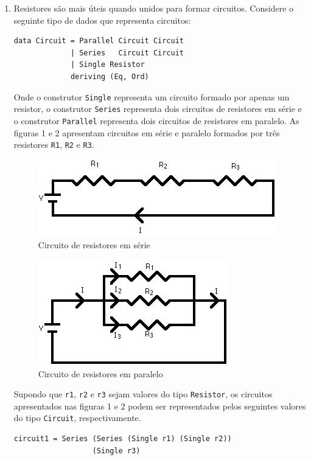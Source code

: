 \documentclass[11pt,a4paper]{article}
\begin{document}
\begin{enumerate}
\begin{enumerate}
    \end{enumerate}
    \item Resistores s\~ao mais \'uteis quando unidos para formar circuitos. Considere o seguinte tipo de dados que representa 
          circuitos:
\begin{verbatim}
data Circuit = Parallel Circuit Circuit
             | Series   Circuit Circuit
             | Single Resistor
             deriving (Eq, Ord)
\end{verbatim}	
Onde o construtor \texttt{Single} representa um circuito formado por apenas um resistor, o construtor \texttt{Series} representa dois circuitos de
resistores em s\'erie e o construtor \texttt{Parallel} representa dois circuitos de resistores em paralelo. As figuras 1 e 2 apresentam circuitos
em s\'erie e paralelo formados por tr\^es resistores \texttt{R1}, \texttt{R2} e \texttt{R3}.
\begin{figure}[htp]			
    \centering
    \includegraphics[scale=0.4]{Rseries.jpg}
    \caption{Circuito de resistores em s\'erie}
\end{figure}
\begin{figure}[htp]			
    \centering
    \includegraphics[scale=0.4]{Rparallel.jpg}
    \caption{Circuito de resistores em paralelo}
\end{figure}
Supondo que \texttt{r1}, \texttt{r2} e \texttt{r3} sejam valores do tipo \texttt{Resistor}, os circuitos apresentados nas figuras 1 e 2 podem
ser representados pelos seguintes valores do tipo \texttt{Circuit}, respectivamente.
\begin{verbatim}
circuit1 = Series (Series (Single r1) (Single r2))
                  (Single r3)


\end{verbatim}
\end{enumerate}
\end{document}
